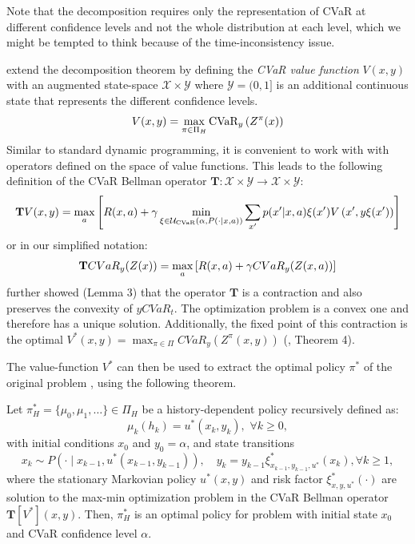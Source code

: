 Note that the decomposition requires only the representation of CVaR at different confidence levels and not the whole distribution at each level, which we might be tempted to think because of the time-inconsistency issue.

\citet{chow2015risk} extend the decomposition theorem by defining the \emph{CVaR value function} $V(x, y)$ with an augmented state-space $\mathcal{X}\times\mathcal{Y}$ where $\mathcal{Y}=(0,1]$ is an additional continuous state that represents the different confidence levels.
%
\begin{equation}
V(x, y)=\max_{\pi \in \Pi_H} \text{CVaR}_{y}\left( {Z^\pi(x)} \right)
\end{equation}
%
Similar to standard dynamic programming, it is convenient to work with with operators defined on the space of value functions. This leads to the following definition of the CVaR Bellman operator $\mathbf{T}:\mathcal{X}\times\mathcal{Y}\to\mathcal{X}\times\mathcal{Y}$:
%
\begin{equation}
\mathbf{T}V(x, y) = \max_a \left[ { R(x, a) + \gamma \min_{\xi \in \mathcal{U}_{\text{CVaR}}(\alpha, P(\cdot | x, a))} \sum_{x'} p(x'| x, a)\xi(x') V\left( {x', y\xi(x')} \right)} \right]
\end{equation}
%
or in our simplified notation:
%
\begin{equation}\label{eqn:tcvar}
\mathbf{T} CVaR_y(Z(x))=\max_a \left[ {R(x, a) + \gamma CVaR_{y}(Z(x, a))} \right]
\end{equation}
%
\citet{chow2015risk} further showed (Lemma 3) that the operator $\mathbf{T}$ is a contraction and also preserves the convexity of $y CVaR_t$. The optimization problem  is a convex one and therefore has a unique solution. Additionally, the fixed point of this contraction is the optimal $V^*(x, y) = \max_{\pi \in \Pi} CVaR_y (Z^\pi(x, y))$ (\citep{chow2015risk}, Theorem 4).
 
The value-function $V^*$ can then be used to extract the optimal policy $\pi^*$ of the original problem , using the following theorem.

\begin{theorem}\label{thm:optimalpolicy}
Let $\pi_H^*=\{\mu_0,\mu_1,\ldots\}\in\Pi_H$ be a history-dependent policy recursively defined as:
\begin{equation}\label{eqn:policy_construct}
\mu_k(h_k) = u^*(x_k, y_k),\,\,\forall k\geq 0,
\end{equation}
with initial conditions $x_0$ and $y_0=\alpha$, and state transitions
\begin{equation}\label{eqn:opt_state}
x_k\sim P(\cdot\mid x_{k-1},u^*(x_{k-1},y_{k-1})),\quad y_k = y_{k-1}\xi_{x_{k-1},y_{k-1},u^*}^*(x_k), \forall k\geq 1,
\end{equation}
where the stationary Markovian policy $u^*(x,y)$ and risk factor $\xi_{x,y,u^*}^*(\cdot)$ are solution to the  max-min optimization problem in the CVaR Bellman operator $\mathbf T[V^*](x,y)$.
Then, $\pi^*_H$ is an optimal policy for problem  with initial state $x_0$ and CVaR confidence level $\alpha$.
\end{theorem}



